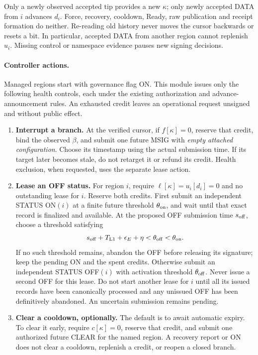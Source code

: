 Only a newly observed accepted tip provides a new $\kappa$; only newly
accepted DATA from $i$ advances $d_i$. Force, recovery, cooldown, Ready,
raw publication and receipt formation do neither. Re-reading old history
never moves the cursor backwards or resets a bit. In particular, accepted
DATA from another region cannot replenish $u_i$. Missing control or
namespace evidence pauses new signing decisions.

\paragraph{Controller actions.}
Managed regions start with governance flag ON. This module issues only
the following health controls, each under the existing authorization and
advance-announcement rules. An exhausted credit leaves an operational
request unsigned and without public effect.
\begin{enumerate}[label=\textbf{H\arabic*)},itemsep=3pt]
\item \textbf{Interrupt a branch.}
At the verified cursor, if $f[\kappa]=0$, reserve that credit, bind the
observed $\beta$, and submit one future MSIG with \emph{empty attached
configuration}. Choose its timestamp using the actual submission time.
If its target later becomes stale, do not retarget it or refund its
credit. Health exclusion, when requested, uses the separate lease action.

\item \textbf{Lease an OFF status.}
For region $i$, require $\ell[\kappa]=u_i[d_i]=0$ and no outstanding
lease for $i$. Reserve both credits. First submit an independent
STATUS ON$(i)$ at a finite future threshold $\theta_{\rm on}$, and wait
until that exact record is finalized and available. At the proposed
OFF submission time $s_{\rm off}$, choose a threshold satisfying
\[
 s_{\rm off}+T_{\rm L1}+\epsilon_E+\eta
 <\theta_{\rm off}<\theta_{\rm on}.
\]
If no such threshold remains, abandon the OFF before releasing its
signature; keep the pending ON and the spent credits. Otherwise submit
an independent STATUS OFF$(i)$ with activation threshold
$\theta_{\rm off}$. Never issue a
second OFF for this lease. Do not start another lease for $i$ until all
its issued records have been canonically processed and any unissued OFF
has been definitively abandoned. An uncertain submission remains pending.

\item \textbf{Clear a cooldown, optionally.}
The default is to await automatic expiry. To clear it early, require
$c[\kappa]=0$, reserve that credit, and submit one authorized future
CLEAR for the named region. A recovery report or ON does not clear a
cooldown, replenish a credit, or reopen a closed branch.
\end{enumerate}

